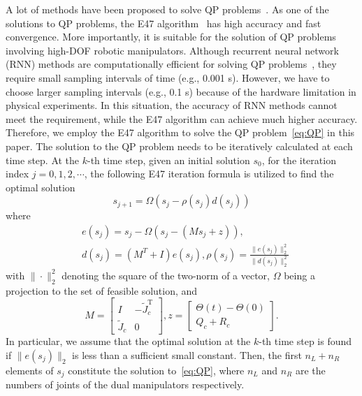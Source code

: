 \documentclass[journal,twoside,web]{ieeecolor}
\begin{document}
A lot of methods have been proposed to solve QP problems~\cite{Xia20204TMTCI}. As one of the solutions to QP problems, the E47 algorithm~\cite{Zhang2011} has high accuracy and fast convergence. More importantly, it is suitable for the solution of QP problems involving high-DOF robotic manipulators. Although recurrent neural network (RNN) methods are computationally efficient for solving QP problems~\cite{Jia2020Robotica,Liu2022b}, they require small sampling intervals of time (e.g., 0.001 s). However, we have to choose larger sampling intervals (e.g., 0.1 s) because of the hardware limitation in physical experiments. In this situation, the accuracy of RNN methods cannot meet the requirement, while the E47 algorithm can achieve much higher accuracy. Therefore, we employ the E47 algorithm to solve the QP problem~\eqref{eq:QP} in this paper. The solution to the QP problem needs to be iteratively calculated at each time step. At the $k$-th time step, given an initial solution $s_0$, for the iteration index $j = 0,1,2,\cdots$, the following E47 iteration formula is utilized to find the optimal solution
\begin{equation}
 s_{j+1} = \Omega\left( s_j - \rho( s_j) d( s_j)\right)
 \label{eq:QP solver}
\end{equation}
where
\begin{equation}
\begin{aligned}
 & e( s_j)  =  s_j - \Omega( s_j -( M  s_j +  z)),\\
 & d( s_j)  = (M^T +  I) e( s_j), 
 \rho( s_j) = \frac{\|e( s_j)\|_2^2}{\|d(s_j)\|_2^2} \label{eq: rho}
\end{aligned}
\end{equation}
with $\|\cdot\|_2^2$ denoting the square of the two-norm of a vector, $\Omega$ being a projection to the set of feasible solution, and
\begin{equation}
M = \left[\begin{matrix}
I &- \tilde{J}_c^\mathrm{T} \\ 
\tilde{J}_c & 0
\end{matrix}\right], z=\left[\begin{matrix}
\Theta(t)-\Theta(0) \\ 
Q_c + R_c
\end{matrix}\right].
\end{equation}
In particular, we assume that the optimal solution at the $k$-th time step is found if $\|e(s_j)\|_2 $ is less than a sufficient small constant. Then, the first $n_L+n_R$ elements of $s_j$ constitute the solution to~\eqref{eq:QP}, where $n_L$ and $n_R$ are the numbers of joints of the dual manipulators respectively.
\end{document}
